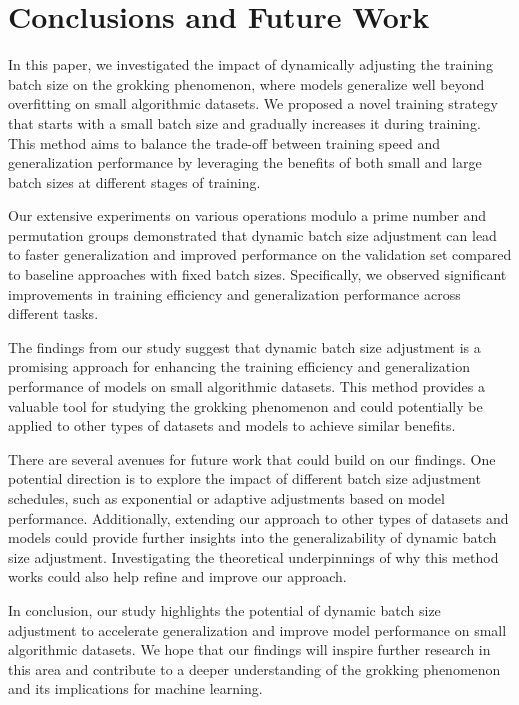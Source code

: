 \documentclass{article} %
\begin{document}
\section{Conclusions and Future Work}
\label{sec:conclusion}

In this paper, we investigated the impact of dynamically adjusting the training batch size on the grokking phenomenon, where models generalize well beyond overfitting on small algorithmic datasets. We proposed a novel training strategy that starts with a small batch size and gradually increases it during training. This method aims to balance the trade-off between training speed and generalization performance by leveraging the benefits of both small and large batch sizes at different stages of training.

Our extensive experiments on various operations modulo a prime number and permutation groups demonstrated that dynamic batch size adjustment can lead to faster generalization and improved performance on the validation set compared to baseline approaches with fixed batch sizes. Specifically, we observed significant improvements in training efficiency and generalization performance across different tasks.

The findings from our study suggest that dynamic batch size adjustment is a promising approach for enhancing the training efficiency and generalization performance of models on small algorithmic datasets. This method provides a valuable tool for studying the grokking phenomenon and could potentially be applied to other types of datasets and models to achieve similar benefits.

There are several avenues for future work that could build on our findings. One potential direction is to explore the impact of different batch size adjustment schedules, such as exponential or adaptive adjustments based on model performance. Additionally, extending our approach to other types of datasets and models could provide further insights into the generalizability of dynamic batch size adjustment. Investigating the theoretical underpinnings of why this method works could also help refine and improve our approach.

In conclusion, our study highlights the potential of dynamic batch size adjustment to accelerate generalization and improve model performance on small algorithmic datasets. We hope that our findings will inspire further research in this area and contribute to a deeper understanding of the grokking phenomenon and its implications for machine learning.



\end{document}
